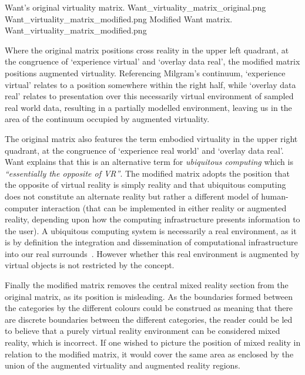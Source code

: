  {Want's original virtuality matrix.} {Want_virtuality_matrix_original.png}
       {Want_virtuality_matrix_modified.png} {Modified Want matrix.} {Want_virtuality_matrix_modified.png}

Where the original matrix positions cross reality in the upper left quadrant, at the congruence of `experience virtual' and `overlay data real', the modified matrix positions augmented virtuality. Referencing Milgram's continuum, `experience virtual' relates to a position somewhere within the right half, while `overlay data real' relates to presentation over this necessarily virtual environment of sampled real world data, resulting in a partially modelled environment, leaving us in the area of the continuum occupied by augmented virtuality.

The original matrix also features the term embodied virtuality in the upper right quadrant, at the congruence of `experience real world' and `overlay data real'. Want explains that this is an alternative term for \textit{ubiquitous computing} which is \textit{``essentially the opposite of VR''}. The modified matrix adopts the position that the opposite of virtual reality is simply reality and that ubiquitous computing does not constitute an alternate reality but rather a different model of human-computer interaction (that can be implemented in either reality or augmented reality, depending upon how the computing infrastructure presents information to the user). A ubiquitous computing system is necessarily a real environment, as it is by definition the integration and dissemination of computational infrastructure into our real surrounds~\cite{York2004}. However whether this real environment is augmented by virtual objects is not restricted by the concept.

Finally the modified matrix removes the central mixed reality section from the original matrix, as its position is misleading. As the boundaries formed between the categories by the different colours could be construed as meaning that there are discrete boundaries between the different categories, the reader could be led to believe that a purely virtual reality environment can be considered mixed reality, which is incorrect. If one wished to picture the position of mixed reality in relation to the modified matrix, it would cover the same area as enclosed by the union of the augmented virtuality and augmented reality regions.


